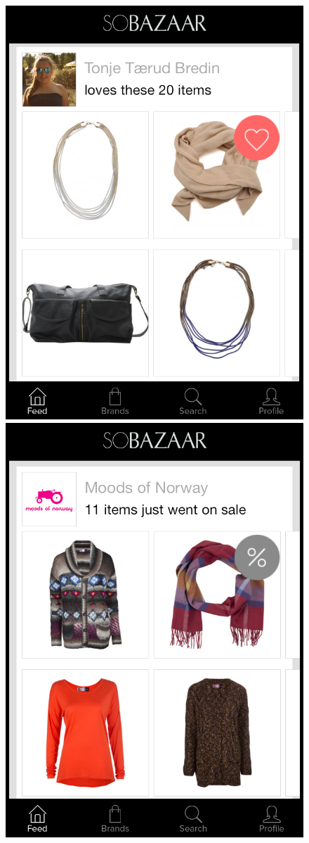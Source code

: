 \begin{figure}[H]
		\centering
		\begin{minipage}{.45\linewidth}
	  		\includegraphics[height=1.2\linewidth]{image/SoBazaarfeed2.png}
		\end{minipage}
		\begin{minipage}{.45\linewidth}
			\includegraphics[height=1.2\linewidth]{image/SoBazaarsale.png} 

\end{minipage}
\end{figure}
